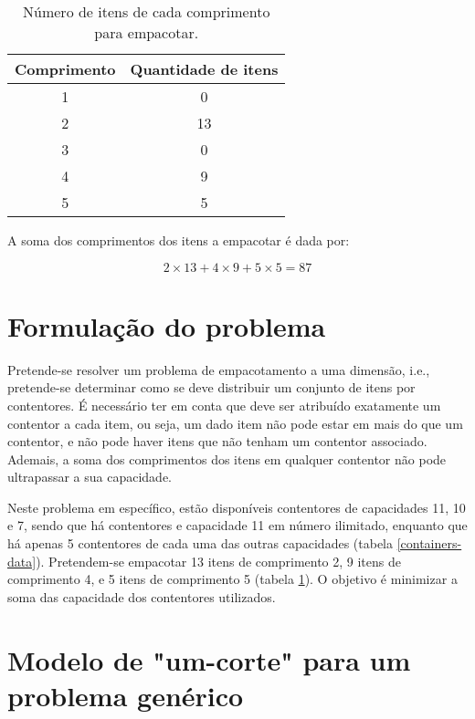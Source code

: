 \documentclass[12pt, a4paper, titlepage]{article}
\begin{document}
\begin{table}[H]
    \begin{center}
        \begin{tabular}{c|c}
            Comprimento & Quantidade de itens \\
            \hline
            1           & 0                    \\
            2           & 13                   \\
            3           & 0                    \\
            4           & 9                    \\
            5           & 5
        \end{tabular}
    \end{center}
    \caption{Número de itens de cada comprimento para empacotar.}
    \label{items-data}
\end{table}

A soma dos comprimentos dos itens a empacotar é dada por:

$$2 \times 13 + 4 \times 9 + 5 \times 5 = 87$$

\section{Formulação do problema}

Pretende-se resolver um problema de empacotamento a uma dimensão, i.e., pretende-se determinar como
se deve distribuir um conjunto de itens por contentores. É necessário ter em conta que deve ser
atribuído exatamente um contentor a cada item, ou seja, um dado item não pode estar em mais do que
um contentor, e não pode haver itens que não tenham um contentor associado. Ademais, a soma dos
comprimentos dos itens em qualquer contentor não pode ultrapassar a sua capacidade.

Neste problema em específico, estão disponíveis contentores de capacidades 11, 10 e 7, sendo que há
contentores e capacidade 11 em número ilimitado, enquanto que há apenas 5 contentores de cada uma
das outras capacidades (tabela \ref{containers-data}). Pretendem-se empacotar 13 itens de
comprimento 2, 9 itens de comprimento 4, e 5 itens de comprimento 5 (tabela \ref{items-data}). O
objetivo é minimizar a soma das capacidade dos contentores utilizados.


\section{Modelo de "um-corte"{} para um problema genérico}
\end{document}
